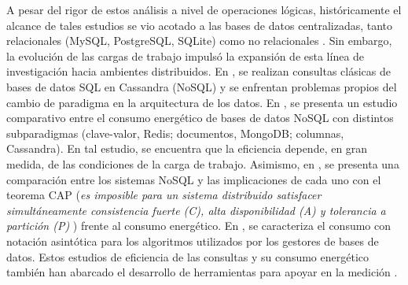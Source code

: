 \documentclass[12pt, letter paper]{report}
\begin{document}
      A pesar del rigor de estos análisis a nivel de operaciones lógicas,
      históricamente el alcance de tales estudios se vio acotado a las bases de
      datos centralizadas, tanto relacionales (MySQL, PostgreSQL, SQLite)
      \cite{xuexploring2010, langtowards2009, langrethinking2011,
      niemanndoes2013, niemannevaluating2013, langtowards2012} como no
      relacionales \cite{duarteevaluating2018, shahcomprehensive2022}. Sin
      embargo, la evolución de las cargas de trabajo impulsó la expansión de
      esta línea de investigación hacia ambientes distribuidos. En
      \cite{foschinisql2023}, se realizan consultas clásicas de bases de datos
      SQL en Cassandra (NoSQL) y se enfrentan problemas propios del cambio de
      paradigma en la arquitectura de los datos. En \cite{gomesenergy2016}, se
      presenta un estudio comparativo entre el consumo energético de bases de
      datos NoSQL con distintos subparadigmas (clave-valor, Redis; documentos,
      MongoDB; columnas, Cassandra). En tal estudio, se encuentra que la
      eficiencia depende, en gran medida, de las condiciones de la carga de
      trabajo. Asimismo, en \cite{gomesnosql-based2023}, se presenta una
      comparación entre los sistemas NoSQL y las implicaciones de cada uno con
      el teorema CAP (\textit{es imposible para un sistema distribuido
      satisfacer simultáneamente consistencia fuerte (C), alta disponibilidad
      (A) y tolerancia a partición (P)} \cite{brewer2000towards,
      gilbert2002brewer}) frente al consumo energético. En
      \cite{songtowards2023}, se caracteriza el consumo con notación asintótica
      para los algoritmos utilizados por los gestores de bases de datos. Estos
      estudios de eficiencia de las consultas y su consumo energético también
      han abarcado el desarrollo de herramientas para apoyar en la medición
      \cite{lellatowards2024, prokhorenkooffloaded2024}.
\end{document}
